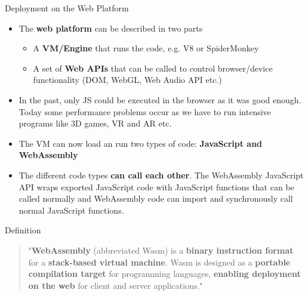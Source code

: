 \documentclass{beamer}
\begin{document}
\begin{frame}{Deployment on the Web Platform}
    \begin{itemize}
        \item The \textbf{web platform} can be described in two parts
              \begin{itemize}
                  \item A \textbf{VM/Engine} that runs the code, e.g. V8 or SpiderMonkey
                  \item A set of \textbf{Web APIs} that can be called to control browser/device functionality (DOM, WebGL, Web Audio API etc.)
              \end{itemize}
        \item In the past, only JS could be executed in the browser as it was good enough. Today some performance problems occur as we have to run intensive programs like 3D games, VR and AR etc.
        \item The VM can now load an run two types of code: \textbf{JavaScript and WebAssembly}
        \item The different code types \textbf{can call each other}. The WebAssembly JavaScript API wraps exported JavaScript code with JavaScript functions that can be called normally and WebAssembly code can import and synchronously call normal JavaScript functions.
    \end{itemize}
\end{frame}

\begin{frame}{Definition}
    \begin{quotation}
        "\textbf{WebAssembly} (abbreviated Wasm) is a \textbf{binary instruction format} for a \textbf{stack-based virtual machine}. Wasm is designed as a \textbf{portable compilation target} for programming languages, \textbf{enabling deployment on the web} for client and server applications."
    \end{quotation}
\end{frame}
\end{document}
